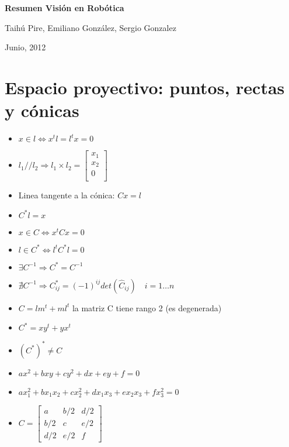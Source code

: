 \documentclass[12pt,a4paper]{article}
\begin{document}
\begin{center}
{\bf Resumen Visi\'on en Rob\'otica}

\medskip
Taih\'u Pire, Emiliano Gonz\'alez, Sergio Gonzalez

Junio, 2012
\end{center}


\setlength{\parindent}{0pt} %

\section{Espacio proyectivo: puntos, rectas y c\'onicas}

\begin{itemize}
	\item $x \in l \Leftrightarrow x^{t}l = l^{t} x = 0$

	\item $l_{1} // l_{2} \Rightarrow l_{1} \times l_{2} = \left[ {\begin{smallmatrix}
	 x_{1}\\
	 x_{2}\\
	 0\\
	\end{smallmatrix} } \right]
	$

	\item Linea tangente a la c\'onica: $C x = l$

	\item $C^{*} l = x$

	\item $x \in C \Leftrightarrow x^{t} C x = 0$


	\item $l \in C^{*} \Leftrightarrow l^{t} C^{*} l = 0$

	\item $ \exists C^{-1} \Rightarrow C^{*} = C^{-1}$

	\item $ \nexists C^{-1} \Rightarrow C_{ij}^{*} = (-1)^{ij} det(\hat{C}_{ij}) \quad i=1\dots n$

	\item $C = lm^{t}+ml^{t}$ la matriz C tiene rango 2 (es degenerada)

	\item $C^{*} = xy^{t}+yx^{t}$

	\item $(C^{*})^{*}  \neq C$

	\item $ax^{2}+bxy+cy^{2}+dx+ey+f = 0$

	\item $ax_{1}^{2}+bx_{1}x_{2}+cx_{2}^{2}+dx_{1}x_{3}+ex_{2}x_{3}+fx_{3}^{2} = 0$


	\item $
	C =
	\left[ {\begin{smallmatrix}
	 a & b/2 & d/2 \\
	 b/2 & c & e/2 \\
	 d/2 & e/2 & f
	\end{smallmatrix} } \right]
	$
\end{itemize}
\end{document}

